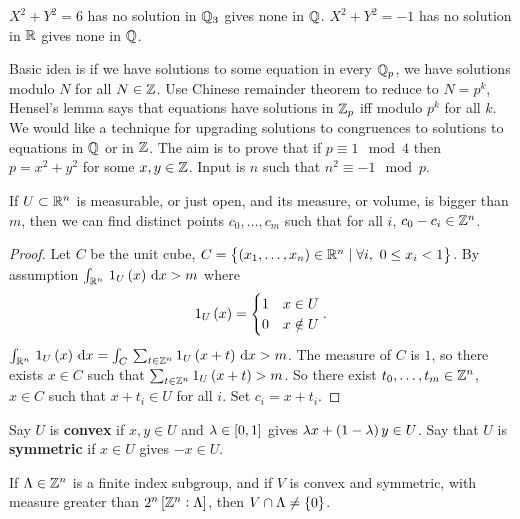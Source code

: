 \begin{example*}
$ X^2 + Y^2 = 6 $ has no solution in $ \mathbb{Q}_3 $ gives none in $ \mathbb{Q} $. $ X^2 + Y^2 = -1 $ has no solution in $ \mathbb{R} $ gives none in $ \mathbb{Q} $.
\end{example*}

Basic idea is if we have solutions to some equation in every $ \mathbb{Q}_p $, we have solutions modulo $ N $ for all $ N \in \mathbb{Z} $. Use Chinese remainder theorem to reduce to $ N = p^k $, Hensel's lemma says that equations have solutions in $ \mathbb{Z}_p $ iff modulo $ p^k $ for all $ k $. We would like a technique for upgrading solutions to congruences to solutions to equations in $ \mathbb{Q} $ or in $ \mathbb{Z} $. The aim is to prove that if $ p \equiv 1 \mod 4 $ then $ p = x^2 + y^2 $ for some $ x, y \in \mathbb{Z} $. Input is $ n $ such that $ n^2 \equiv -1 \mod p $.

\begin{lemma}
\label{lem:4.1}
If $ U \subset \mathbb{R}^n $ is measurable, or just open, and its measure, or volume, is bigger than $ m $, then we can find distinct points $ c_0, \dots, c_m $ such that for all $ i $, $ c_0 - c_i \in \mathbb{Z}^n $.
\end{lemma}

\begin{proof}
Let $ C $ be the unit cube, $ C = \cbr{\br{x_1, \dots, x_n} \in \R^n \mid \forall i, \ 0 \le x_i < 1} $. By assumption $ \intd{\R^n}{}{1_U\br{x}}{x} > m $ where
$$ 1_U\br{x} =
\begin{cases}
1 & x \in U \\
0 & x \notin U
\end{cases}.
$$
$ \intd{\R^n}{}{1_U\br{x}}{x} = \intd{C}{}{\sum_{t \in \Z^n} 1_U\br{x + t}}{x} > m $. The measure of $ C $ is $ 1 $, so there exists $ x \in C $ such that $ \sum_{t \in \Z^n} 1_U\br{x + t} > m $. So there exist $ t_0, \dots, t_m \in \mathbb{Z}^n $, $ x \in C $ such that $ x + t_i \in U $ for all $ i $. Set $ c_i = x + t_i $.
\end{proof}

\begin{definition}
Say $ U $ is \textbf{convex} if $ x, y \in U $ and $ \lambda \in \sbr{0, 1} $ gives $ \lambda x + \br{1 - \lambda}y \in U $. Say that $ U $ is \textbf{symmetric} if $ x \in U $ gives $ -x \in U $.
\end{definition}

\begin{corollary}[Minkowski]
\label{cor:4.3}
If $ \Lambda \in \mathbb{Z}^n $ is a finite index subgroup, and if $ V $ is convex and symmetric, with measure greater than $ 2^n\sbr{\Z^n : \Lambda} $, then $ V \cap \Lambda \ne \cbr{0} $.
\end{corollary}

